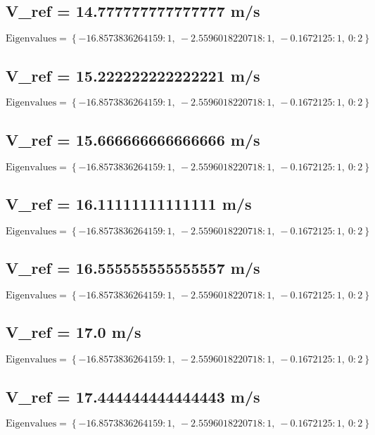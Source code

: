 \documentclass{article}
\begin{document}
\subsection*{V_ref = 14.777777777777777 m/s}
\begin{equation}
\text{Eigenvalues} = \left\{ -16.8573836264159 : 1, \  -2.5596018220718 : 1, \  -0.1672125 : 1, \  0 : 2\right\}
\end{equation}
\subsection*{V_ref = 15.222222222222221 m/s}
\begin{equation}
\text{Eigenvalues} = \left\{ -16.8573836264159 : 1, \  -2.5596018220718 : 1, \  -0.1672125 : 1, \  0 : 2\right\}
\end{equation}
\subsection*{V_ref = 15.666666666666666 m/s}
\begin{equation}
\text{Eigenvalues} = \left\{ -16.8573836264159 : 1, \  -2.5596018220718 : 1, \  -0.1672125 : 1, \  0 : 2\right\}
\end{equation}
\subsection*{V_ref = 16.11111111111111 m/s}
\begin{equation}
\text{Eigenvalues} = \left\{ -16.8573836264159 : 1, \  -2.5596018220718 : 1, \  -0.1672125 : 1, \  0 : 2\right\}
\end{equation}
\subsection*{V_ref = 16.555555555555557 m/s}
\begin{equation}
\text{Eigenvalues} = \left\{ -16.8573836264159 : 1, \  -2.5596018220718 : 1, \  -0.1672125 : 1, \  0 : 2\right\}
\end{equation}
\subsection*{V_ref = 17.0 m/s}
\begin{equation}
\text{Eigenvalues} = \left\{ -16.8573836264159 : 1, \  -2.5596018220718 : 1, \  -0.1672125 : 1, \  0 : 2\right\}
\end{equation}
\subsection*{V_ref = 17.444444444444443 m/s}
\begin{equation}
\text{Eigenvalues} = \left\{ -16.8573836264159 : 1, \  -2.5596018220718 : 1, \  -0.1672125 : 1, \  0 : 2\right\}
\end{equation}
\end{document}
